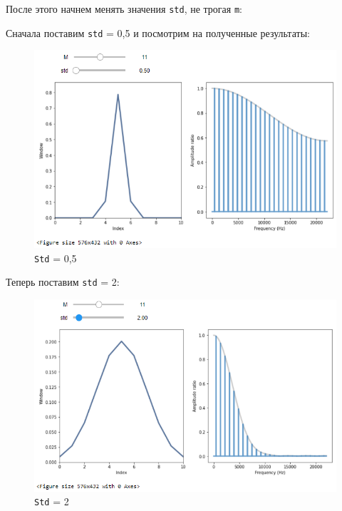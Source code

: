 \documentclass[a4paper]{article}
\begin{document}
            После этого начнем менять значения \texttt{std}, не трогая \texttt{m}:
            
            Сначала поставим \texttt{std} = 0,5 и посмотрим на полученные результаты:
            
            \begin{figure}[H]
                \centering
                \includegraphics[width=\textwidth]{ex_1_std_0_5.png}
                \caption{\texttt{Std} = 0,5}
                \label{fig:ex_1_std_0_5}
            \end{figure}
            
            Теперь поставим \texttt{std} = 2:
            
            \begin{figure}[H]
                \centering
                \includegraphics[width=\textwidth]{ex_1_std_2.png}
                \caption{\texttt{Std} = 2}
                \label{fig:ex_1_std_2}
            \end{figure}
            
\end{document}
